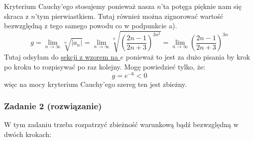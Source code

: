 \documentclass[11pt]{article}
\begin{document}
\begin{list}{}{}
{\[        \]
        Kryterium Cauchy'ego stosujemy ponieważ nasza $n$'ta potęga pięknie nam się skraca z 
        $n$'tym pierwiastkiem. Tutaj również można zignorować wartość bezwzględną z tego samego powodu
        co w podpunkcie a).
        \[
            g = \lim_{n\to\infty}{\sqrt[n]{\left\lvert a_n \right\rvert}} = 
            \lim_{n\to\infty}{\sqrt[n]{(\frac{2n - 1}{2n + 3})^{3n^2}}}
            = \lim_{n\to\infty}(\frac{2n - 1}{2n + 3})^{3n}
        \]
        Tutaj odsyłam do \hyperlink{subsection.2.2}{sekcji z wzorem na $e$} ponieważ to jest za dużo pisania by
        krok po kroku to rozpisywać po raz kolejny. Mogę powiedzieć tylko, że:
        \[
            g = e^{-6} < 0
        \]
        więc na mocy kryterium Cauchy'ego szereg ten jest zbieżny.
    }
\end{list}
\newpage
\subsubsection{Zadanie 2 (rozwiązanie)}
W tym zadaniu trzeba rozpatrzyć zbieżność warunkową bądź bezwzględną w dwóch krokach:
\end{document}
